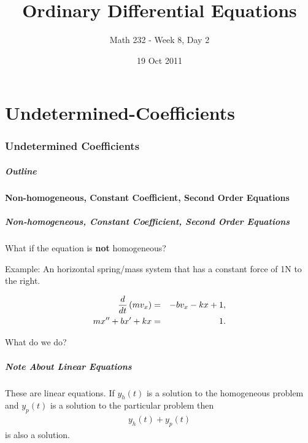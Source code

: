 \part{Undetermined-Coefficients}
\section{Undetermined Coefficients}

\title{Ordinary Differential Equations}
\subtitle{Math 232 - Week 8, Day 2}
\date{19 Oct 2011}

\begin{frame}
  \titlepage
\end{frame}

\begin{frame}
  \frametitle{Outline}
\end{frame}


\subsection{Non-homogeneous, Constant Coefficient, Second Order Equations}


\begin{frame}
  \frametitle{Non-homogeneous, Constant Coefficient, Second Order
    Equations}
  What if the equation is \textbf{not} homogeneous?

  Example: An horizontal spring/mass system that has a constant force
  of 1N to the right.

  \begin{eqnarray*}
    \frac{d}{dt} \left( m v_x \right) & = & -b v_x - kx + 1, \\
    m x'' + bx' + kx & = & 1.
  \end{eqnarray*}

  What do we do?


\end{frame}


\begin{frame}
  \frametitle{Note About Linear Equations}

  These are linear equations. If $y_h(t)$ is a solution to the
  homogeneous problem and $y_p(t)$ is a solution to the particular
  problem then
  \begin{eqnarray*}
    y_h(t) + y_p(t)
  \end{eqnarray*}
  is also a solution.

\end{frame}


